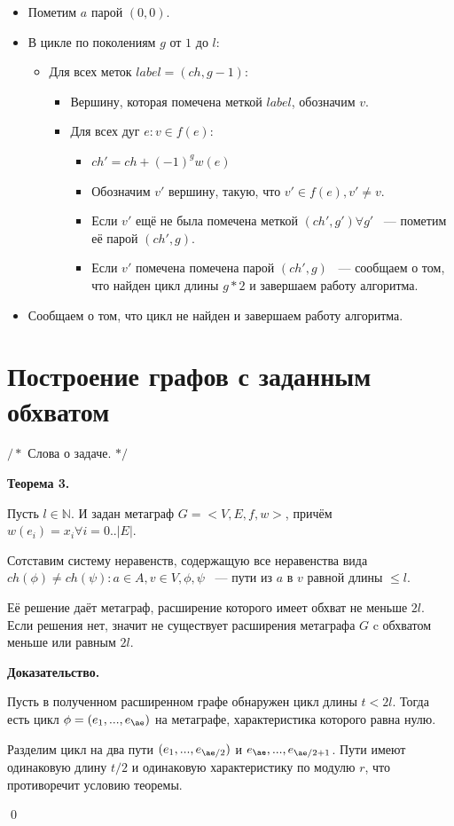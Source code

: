 \documentclass[14pt]{mmcs-article}
\begin{document}
\begin{itemize}
    \item Пометим $a$ парой $(0, 0)$.
    \item В цикле по поколениям $g$ от $1$ до $l$:
      \begin{itemize}
      \item Для всех меток $label = (ch, g - 1)$:
        \begin{itemize}
        \item Вершину, которая помечена меткой $label$, обозначим $v$.
        \item Для всех дуг $e: v \in f(e)$:
          \begin{itemize}
          \item $ch' = ch + (-1)^{g} w(e)$
          \item Обозначим $v'$ вершину, такую, что $v' \in f(e), v' \neq v$.
          \item Если $v'$ ещё не была помечена меткой $(ch', g') \forall g'$ ~--- пометим её парой $(ch', g)$.
          \item Если $v'$ помечена помечена парой $(ch', g)$ ~--- сообщаем о том, что найден цикл длины $g * 2$ и завершаем работу алгоритма.
          \end{itemize}
        \end{itemize}
      \end{itemize}
    \item Сообщаем о том, что цикл не найден и завершаем работу алгоритма.
\end{itemize}

\pagebreak
\section*{Построение графов с заданным обхватом}

$/*$ Слова о задаче. $*/$

\textbf{Теорема 3.}

Пусть $l \in \mathbb{N}.$ И задан метаграф $G = <V, E, f, w>$, причём $w(e_i) = x_i \forall i = 0..|E|$.

Сотставим систему неравенств, содержащую все неравенства вида $ch(\phi) \neq ch(\psi) : a \in A, v \in V, \phi, \psi$ ~--- пути из $a$ в $v$ равной длины $\leq l$.

Её решение даёт метаграф, расширение которого имеет обхват не меньше $2l$. Если решения нет, значит не существует расширения метаграфа $G$ c обхватом меньше или равным $2l$.

\textbf{Доказательство.}

Пусть в полученном расширенном графе обнаружен цикл длины $t < 2l$. Тогда есть цикл $\phi = (e_1, ..., e_{\ae})$ на метаграфе, характеристика которого равна нулю.

Разделим цикл на два пути $(e_1, ..., e_{\ae/2})$ и ${e_{\ae}, ..., e_{\ae/2 + 1}}$. Пути имеют одинаковую длину $t / 2$ и одинаковую характеристику по модулю $r$, что противоречит условию теоремы.

\qed
\end{document}
